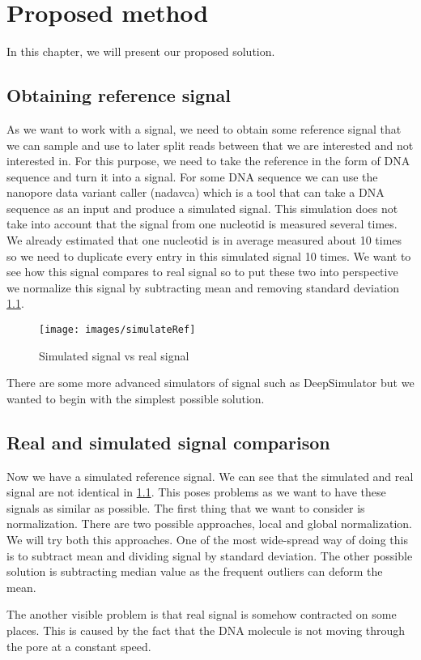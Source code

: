 \chapter{Proposed method}

\label{kap:proposedMethod} %

In this chapter, we will present our proposed solution.

\section{Obtaining reference signal}

As we want to work with a signal, we need to obtain some reference signal that we
can sample and use to later split reads between that we are interested and not
interested in. For this purpose, we need to take the reference in the form of DNA sequence
and turn it into a signal. For some DNA sequence we can use the nanopore data
variant caller (nadavca) which is a tool that can take a DNA sequence as an input
and produce a simulated signal. This simulation does not take into account that
the signal from one nucleotid is measured several times. We already estimated
that one nucleotid is in average measured about 10 times so we need to duplicate every
entry in this simulated signal 10 times. We want to see how this signal compares
to real signal so to put these two into perspective we normalize this signal by
subtracting mean and removing standard deviation \ref{obr:simVsReal}.

\begin{figure}
\centerline{\texttt{[image: images/simulateRef]}}
\caption[Hehe]{Simulated signal vs real signal}
\label{obr:simVsReal}
\end{figure}

There are some more advanced simulators of signal such as DeepSimulator but we
wanted to begin with the simplest possible solution.

\section{Real and simulated signal comparison}

Now we have a simulated reference signal. We can see that the simulated and real
signal are not identical in \ref{obr:simVsReal}. This poses problems as we want to have these signals as
similar as possible. The first thing that we want to consider is normalization. There
are two possible approaches, local and global normalization. We will try both this
approaches. One of the most wide-spread way of doing this is to subtract mean and dividing
signal by standard deviation. The other possible solution is subtracting median value
as the frequent outliers can deform the mean. 

The another visible problem is that real signal is somehow contracted
on some places. This is caused by the fact that the DNA molecule is not moving
through the pore at a constant speed. 
